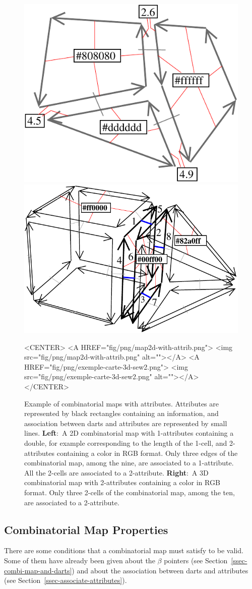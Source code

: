\begin{figure}
  \begin{ccTexOnly}
    \begin{center}
      \includegraphics[width=.3\textwidth]{Combinatorial_map/fig/pdf/map2d-with-attrib}\qquad
      \includegraphics[width=.45\textwidth]{Combinatorial_map/fig/pdf/exemple-carte-3d-sew2}
    \end{center}
  \end{ccTexOnly}
  \begin{ccHtmlOnly}
    <CENTER> <A HREF="fig/png/map2d-with-attrib.png"> <img
    src="fig/png/map2d-with-attrib.png" alt=""></A> <A
    HREF="fig/png/exemple-carte-3d-sew2.png"> <img
    src="fig/png/exemple-carte-3d-sew2.png" alt=""></A> </CENTER>
  \end{ccHtmlOnly}
  \caption{Example of combinatorial maps with attributes. Attributes
    are represented by black rectangles containing an information, and
    association between darts and attributes are represented by small
    lines.  \textbf{Left}:~A 2D combinatorial map with 1-attributes
    containing a double, for example corresponding to the length of
    the 1-cell, and 2-attributes containing a color in RGB format.
    Only three edges of the combinatorial map, among the nine, are
    associated to a 1-attribute. All the 2-cells are associated to a
    2-attribute. \textbf{Right}:~A 3D combinatorial map with
    2-attributes containing a color in RGB format. Only three 2-cells
    of the combinatorial map, among the ten, are associated to a
    2-attribute.}
  \label{fig-exemple-attribs}
\end{figure}

\subsection{Combinatorial Map Properties}\label{ssec-combimap-validity}
There are some conditions that a combinatorial map must satisfy to be
valid. Some of them have already been given about the $\beta$ pointers
(see Section~\ref{ssec-combi-map-and-darts}) and about the association
between darts and attributes (see
Section~\ref{ssec-associate-attributes}).

